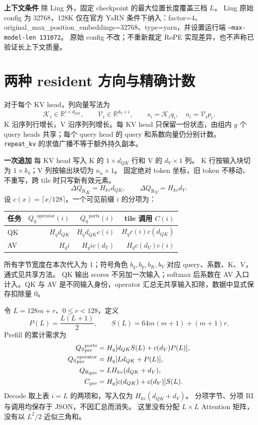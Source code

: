 \documentclass[UTF8,a4paper,11pt]{ctexart}
\newcommand{\qs}{{Q_{\mathrm S}}}\newcommand{\qr}{{Q_{\mathrm R}}}\newcommand{\ri}{\mathrm{RI}}
\newcommand{\op}{\mathrm{operator}}\newcommand{\ports}{\mathrm{ports}}
\newcommand{\para}[1]{\par\textbf{#1}\quad}
\begin{document}
\para{上下文条件} 除 Ling 外，固定 checkpoint 的最大位置长度覆盖三档 $L$。
Ling 原始 config 为 32768，128K 仅在官方 YaRN 条件下纳入：factor=$4$、original\_max\_position\_embeddings=$32768$、type=yarn，并设置运行端 \texttt{--max-model-len 131072}。
原始 config 不改；不重新裁定 RoPE 实现差异，也不声称已验证长上下文质量。

\clearpage
\section{两种 resident 方向与精确计数}
对于每个 KV head，列向量写法为
\[
\mathcal K_i\in\mathbb R^{i\times d_{QK}},\qquad
\mathcal V_i\in\mathbb R^{d_V\times i},\qquad
s_i=\mathcal K_i q_i,\quad o_i=\mathcal V_i p_i.
\]
K 沿序列行增长，V 沿序列列增长。每 KV head 只保留一份状态，由组内 $g$ 个 query heads 共享；每个 query head 的 query 和系数向量仍分别计数。
\texttt{repeat\_kv} 的求值广播不等于额外持久副本。

\para{一次追加} 每 KV head 写入 K 的 $1\times d_{QK}$ 行和 V 的 $d_V\times1$ 列。
K 行按输入块切为 $1\times k_b$；V 列按输出块切为 $n_a\times1$。
固定绝对 token 坐标，旧 token 不移动、不重写，跨 tile 时只写新有效元素。
\[
\Delta\qr_K=H_{kv}d_{QK},\qquad \Delta\qr_V=H_{kv}d_V.
\]
设 $c(x)=\lceil x/128\rceil$。一个可见前缀 $i$ 的分项为：
\begin{center}\small
\begin{tabular}{@{}lrrr@{}}\toprule
任务 & $\qs^{\op}(i)$ & $\qs^{\ports}(i)$ & tile 调用 $C(i)$\\\midrule
QK & $H_qd_{QK}$ & $H_qd_{QK}c(i)$ & $H_qc(i)c(d_{QK})$\\[5pt]
AV & $H_qi$ & $H_qi c(d_V)$ & $H_qc(d_V)c(i)$\\\bottomrule
\end{tabular}\end{center}
所有字节宽度在本次代入为 1；符号角色 $b_q,b_p,b_K,b_V$ 对应 query、系数、K、V，通式见共享方法。
QK 输出 scores 不另加一次输入；softmax 后系数在 AV 入口计入。QK 与 AV 是不同输入身份，operator 汇总无共享输入扣除，数据中显式保存扣除量 0。

令 $L=128m+r$、$0\le r<128$，定义
\[
P(L)=\frac{L(L+1)}2,\qquad S(L)=64m(m+1)+(m+1)r.
\]
Prefill 的累计需求为
\begin{align*}
\qs^{\ports}_{\rm pre}&=H_q[d_{QK}S(L)+c(d_V)P(L)],\\
\qs^{\op}_{\rm pre}&=H_q[Ld_{QK}+P(L)],\\
\qr_{\rm pre}&=LH_{kv}(d_{QK}+d_V),\\
C_{\rm pre}&=H_q[c(d_{QK})+c(d_V)]S(L).
\end{align*}
Decode 取上表 $i=L$ 的两项和，写入仅为 $H_{kv}(d_{QK}+d_V)$。
分项字节、分项 RI 与调用均保存于 JSON，不因汇总而消失。
这里没有分配 $L\times L$ Attention 矩阵，没有以 $L^2/2$ 近似三角和。
\end{document}
